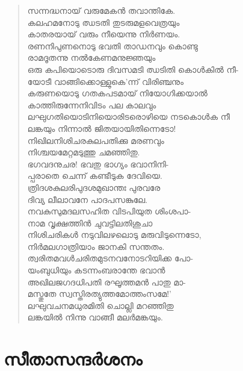 \begin{verse}
സന്നദ്ധനായ് വരുമേകന്‍ തവാന്തികേ.\\
കലഹമനോടു ഝടതി തുടരുമളവെത്രയും\\
കാതരയായ് വരും നീയെന്നു നിര്‍ണയം.\\
രണനിപുണനൊടു ഭവതി താഡനവും കൊണ്ടു\\
രാമദൂതന്നു നല്‍കേണമനുജ്ഞയും\\
ഒരു കപിയൊടൊരു ദിവസമടി ഝടിതി കൊള്‍കില്‍ നീ-\\
യോടീ വാങ്ങിക്കൊള്ളുകെ’ന്ന് വിരിഞ്ചനും\\
കരുണയൊടു ഗതകപടമായ് നിയോഗിക്കയാല്‍\\
കാത്തിരുന്നേനിവിടം പല കാലവും\\
ലഘുഗതിയൊടിനിയൊരിടരൊഴിയെ നടകൊള്‍ക നീ\\
ലങ്കയും നിന്നാല്‍ ജിതയായിതിന്നെടോ!\\
നിഖിലനിശിചരകുലപതിക്കു മരണവും\\
നിശ്ചയമേറ്റമടുത്തു ചമഞ്ഞിതു.\\
ഭഗവദനുചര! ഭവതു ഭാഗ്യം ഭവാനിനി-\\
പ്പരാതെ ചെന്ന് കണ്ടീടുക ദേവിയെ.\\
ത്രിദശകുലരിപുദശമുഖാന്തഃ പുരവരേ\\
ദിവ്യ ലീലാവനേ പാദപസങ്കുലേ.\\
നവകുസുമദലസഹിത വിടപിയുത ശിംശപാ-\\
നാമ വൃക്ഷത്തിന്‍ ചുവട്ടിലതിശുചാ\\
നിശിചരികള്‍ നടുവിലഴലൊടു മരുവിടുന്നെടോ,\\
നിര്‍മലഗാത്രിയാം ജാനകി സന്തതം.\\
ത്വരിതമവള്‍ചരിതമുടനവനോടറിയിക്ക പോ-\\
യംബുധിയും കടന്നംബരാന്തേ ഭവാന്‍\\
അഖിലജഗദധിപതി രഘൂത്തമന്‍ പാതു മാ-\\
മസ്തുതേ സ്വസ്തിരത്യുത്തമോത്തംസമേ!’\\
ലഘുവചനമധുരമിതി ചൊല്ലി മറഞ്ഞിതു\\
ലങ്കയില്‍ നിന്നു വാങ്ങീ മലര്‍മങ്കയും.
\end{verse}


\section{സീതാസന്ദര്‍ശനം}

